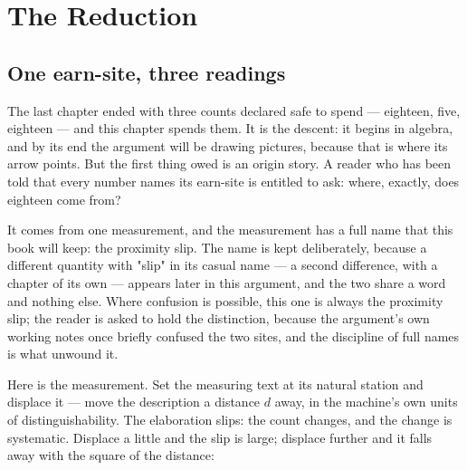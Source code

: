 \chapter{The Reduction}

\section{One earn-site, three readings}

The last chapter ended with three counts declared safe to spend --- eighteen, five,
eighteen --- and this chapter spends them. It is the descent: it begins in algebra,
and by its end the argument will be drawing pictures, because that is where its arrow
points. But the first thing owed is an origin story. A reader who has been told that
every number names its earn-site is entitled to ask: where, exactly, does eighteen
come from?

It comes from one measurement, and the measurement has a full name that this book will
keep: the proximity slip. The name is kept deliberately, because a different quantity
with "slip" in its casual name --- a second difference, with a chapter of its own ---
appears later in this argument, and the two share a word and nothing else. Where
confusion is possible, this one is always the proximity slip; the reader is asked to
hold the distinction, because the argument's own working notes once briefly confused
the two sites, and the discipline of full names is what unwound it.

Here is the measurement. Set the measuring text at its natural station and displace it
--- move the description a distance $d$ away, in the machine's own units of
distinguishability. The elaboration slips: the count changes, and the change is
systematic. Displace a little and the slip is large; displace further and it falls
away with the square of the distance:

